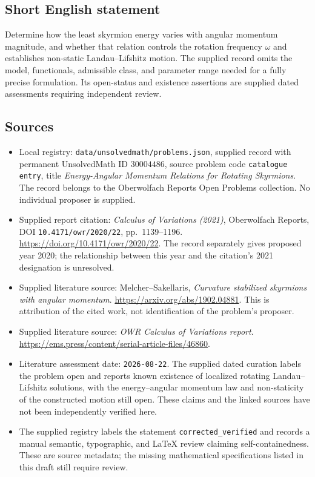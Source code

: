 \documentclass[11pt]{article}
\begin{document}
\subsection{Short English statement}
Determine how the least skyrmion energy varies with angular momentum magnitude, and whether that relation controls the rotation frequency \(\omega\) and establishes non-static Landau--Lifshitz motion. The supplied record omits the model, functionals, admissible class, and parameter range needed for a fully precise formulation. Its open-status and existence assertions are supplied dated assessments requiring independent review.
\subsection{Sources}
\begin{itemize}
\item Local registry: \texttt{data/unsolvedmath/problems.json}, supplied record with permanent UnsolvedMath ID \(30004486\), source problem code \texttt{catalogue entry}, title \emph{Energy-Angular Momentum Relations for Rotating Skyrmions}. The record belongs to the Oberwolfach Reports Open Problems collection. No individual proposer is supplied.
\item Supplied report citation: \emph{Calculus of Variations (2021)}, Oberwolfach Reports, DOI \texttt{10.4171/owr/2020/22}, pp.\ 1139--1196. \url{https://doi.org/10.4171/owr/2020/22}. The record separately gives proposed year 2020; the relationship between this year and the citation's 2021 designation is unresolved.
\item Supplied literature source: Melcher--Sakellaris, \emph{Curvature stabilized skyrmions with angular momentum}. \url{https://arxiv.org/abs/1902.04881}. This is attribution of the cited work, not identification of the problem's proposer.
\item Supplied literature source: \emph{OWR Calculus of Variations report}. \url{https://ems.press/content/serial-article-files/46860}.
\item Literature assessment date: \texttt{2026-08-22}. The supplied dated curation labels the problem open and reports known existence of localized rotating Landau--Lifshitz solutions, with the energy--angular momentum law and non-staticity of the constructed motion still open. These claims and the linked sources have not been independently verified here.
\item The supplied registry labels the statement \texttt{corrected\_verified} and records a manual semantic, typographic, and LaTeX review claiming self-containedness. These are source metadata; the missing mathematical specifications listed in this draft still require review.
\end{itemize}
\end{document}

